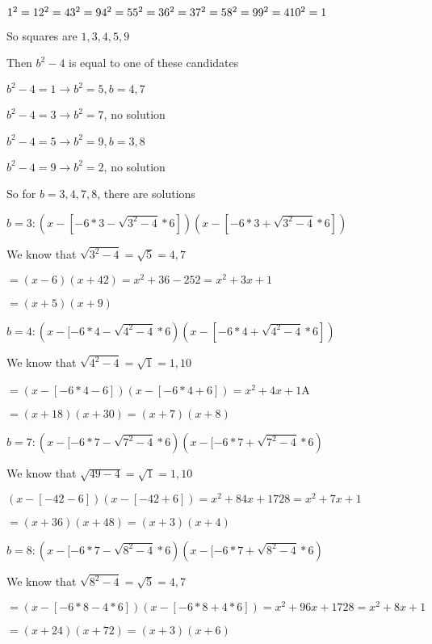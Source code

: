 \documentclass[12pt]{article}
\begin{document}
\begin{itemize}
		$1^2 = 1\\
		2^2 = 4\\
		3^2 = 9\\
		4^2 = 5\\
		5^2 = 3\\
		6^2 = 3\\
		7^2 = 5\\
		8^2 = 9\\
		9^2 = 4\\
		10^2 = 1\\$

		So squares are $1, 3, 4, 5, 9$

		Then $b^2 - 4$ is equal to one of these candidates

		$b^2 - 4 = 1 \rightarrow b^2 = 5, b = 4,7$

		$b^2 - 4 = 3 \rightarrow b^2 = 7$, no solution

		$b^2  -4 = 5 \rightarrow b^2 = 9, b = 3,8$

		$b^2 - 4 = 9 \rightarrow b^2 = 2$, no solution

		So for $b = 3, 4, 7, 8$, there are solutions

		$b=3: (x -[-6*3 - \sqrt{3^2 - 4}*6])(x - [-6*3 + \sqrt{3^2 - 4}*6])$

		We know that $\sqrt{3^2 - 4} = \sqrt{5} = 4, 7$

		$=(x-6)(x+42) = x^2 + 36 - 252 = x^2 + 3x + 1$
		
		$=(x+5)(x+9)$

		$b=4: (x-[-6*4 - \sqrt{4^2 - 4}*6)(x-[-6*4 + \sqrt{4^2 - 4}*6])$

		We know that $\sqrt{4^2 - 4} = \sqrt{1} = 1, 10$

		$=(x-[-6*4 - 6])(x-[-6*4+6]) = x^2 + 4x + 1$A

		$=(x+18)(x+30) = (x+7)(x+8)$

		$b=7: (x-[-6*7 - \sqrt{7^2 - 4}*6)(x -[-6*7 + \sqrt{7^2 -4}*6)$

		We know that $\sqrt{49-4} = \sqrt{1}= 1, 10$

		$(x-[-42-6])(x-[-42+6]) = x^2 + 84x + 1728 = x^2 + 7x + 1$

		$=(x+36)(x+48) = (x+3)(x+4)$

		$b=8: (x-[-6*7 - \sqrt{8^2 - 4}*6)(x-[-6*7 +\sqrt{8^2 - 4}*6)$

		We know that $\sqrt{8^2 - 4} = \sqrt{5} = 4,7$

		$=(x-[-6*8-4*6])(x-[-6*8+4*6]) = x^2 + 96x + 1728 = x^2 + 8x + 1$

		$=(x+24)(x+72) = (x+3)(x+6)$


\end{itemize}
\end{document}
